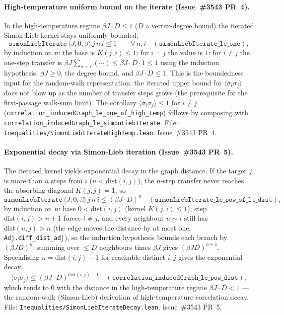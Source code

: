 \documentclass[a4paper,11pt]{article}
\begin{document}
\paragraph{High-temperature uniform bound on the iterate (Issue~\#3543 PR~4).}
In the high-temperature regime $\beta J \cdot D \le 1$ ($D$ a vertex-degree
bound) the iterated Simon-Lieb kernel stays uniformly bounded:
\[
  \texttt{simonLiebIterate}\,\langle J,0,\beta\rangle\,j\,n\,i \le 1
  \qquad \forall\, n, i
  \quad (\texttt{simonLiebIterate\_le\_one}),
\]
by induction on $n$: the base is $K(j,i) \le 1$; for $i=j$ the value is $1$; for
$i \ne j$ the one-step transfer is $\beta J \sum_{u \sim i}(\cdots) \le \beta J
\cdot D \cdot 1 \le 1$ using the induction hypothesis, $\beta J \ge 0$, the degree
bound, and $\beta J \cdot D \le 1$. This is the boundedness input for the
random-walk representation: the iterated upper bound for
$\langle\sigma_i\sigma_j\rangle$ does not blow up as the number of transfer steps
grows (the prerequisite for the first-passage walk-sum limit). The corollary
$\langle\sigma_i\sigma_j\rangle \le 1$ for $i \ne j$
(\texttt{correlation\_inducedGraph\_le\_one\_of\_high\_temp}) follows by composing
with \texttt{correlation\_inducedGraph\_le\_simonLiebIterate}. File:
\texttt{Inequalities/SimonLiebIterateHighTemp.lean}. Issue~\#3543 PR~4.

\paragraph{Exponential decay via Simon-Lieb iteration (Issue~\#3543 PR~5).}
The iterated kernel yields exponential decay in the graph distance. If the target
$j$ is more than $n$ steps from $i$ ($n < \mathrm{dist}(i,j)$), the $n$-step
transfer never reaches the absorbing diagonal $K(j,j)=1$, so
\[
  \texttt{simonLiebIterate}\,\langle J,0,\beta\rangle\,j\,n\,i
    \le (\beta J \cdot D)^n
  \quad (\texttt{simonLiebIterate\_le\_pow\_of\_lt\_dist}),
\]
by induction on $n$: base $0 < \mathrm{dist}(i,j)$ (kernel $K(j,i)\le 1$); step
$\mathrm{dist}(i,j) > n+1$ forces $i \ne j$, and every neighbour $u \sim i$ still
has $\mathrm{dist}(u,j) > n$ (the edge moves the distance by at most one,
\texttt{Adj.diff\_dist\_adj}), so the induction hypothesis bounds each branch by
$(\beta J D)^n$; summing over $\le D$ neighbours times $\beta J$ gives $(\beta J
D)^{n+1}$. Specialising $n = \mathrm{dist}(i,j)-1$ for reachable distinct $i,j$
gives the exponential decay
\[
  \langle\sigma_i\sigma_j\rangle \le (\beta J \cdot D)^{\mathrm{dist}(i,j)-1}
  \quad (\texttt{correlation\_inducedGraph\_le\_pow\_dist}),
\]
which tends to $0$ with the distance in the high-temperature regime $\beta J
\cdot D < 1$ --- the random-walk (Simon-Lieb) derivation of high-temperature
correlation decay. File: \texttt{Inequalities/SimonLiebIterateDecay.lean}.
Issue~\#3543 PR~5.
\end{document}
